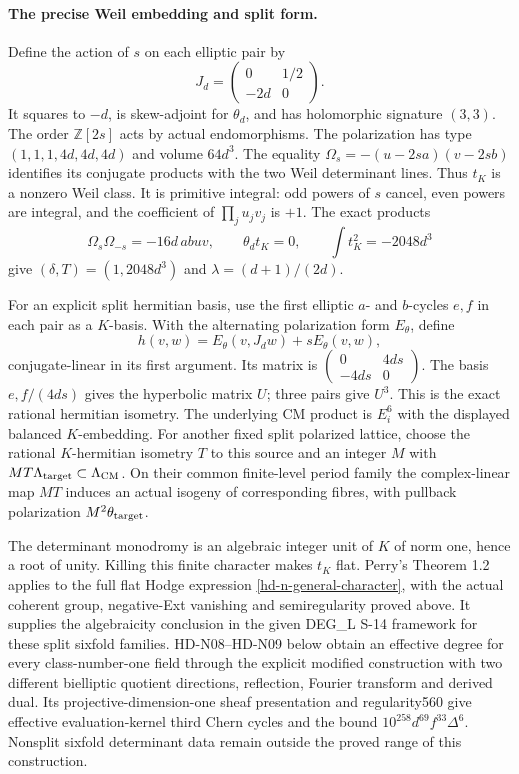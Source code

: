 \paragraph{The precise Weil embedding and split form.}
Define the action of $s$ on each elliptic pair by
\[
 J_d=\begin{pmatrix}0&1/2\\-2d&0\end{pmatrix}.
\]
It squares to $-d$, is skew-adjoint for $\theta_d$, and has
holomorphic signature $(3,3)$. The order $\mathbb Z[2s]$ acts by
actual endomorphisms. The polarization has type
$(1,1,1,4d,4d,4d)$ and volume $64d^3$. The equality
$\Omega_s=-(u-2sa)(v-2sb)$ identifies its conjugate products with the
two Weil determinant lines. Thus $t_K$ is a nonzero Weil class.
It is primitive integral: odd powers of $s$ cancel, even powers are
integral, and the coefficient of $\prod_ju_jv_j$ is $+1$.
The exact products
\[
 \Omega_s\Omega_{-s}=-16d\,abuv,
 \qquad \theta_dt_K=0,\qquad \int t_K^2=-2048d^3
\]
give $(\delta,T)=(1,2048d^3)$ and
$\lambda=(d+1)/(2d)$.

For an explicit split hermitian basis, use the first elliptic
$a$- and $b$-cycles $e,f$ in each pair as a $K$-basis. With the
alternating polarization form $E_\theta$, define
\[
 h(v,w)=E_\theta(v,J_dw)+sE_\theta(v,w),
\]
conjugate-linear in its first argument. Its matrix is
$\left(\begin{smallmatrix}0&4ds\\-4ds&0\end{smallmatrix}\right)$.
The basis $e,f/(4ds)$ gives the hyperbolic matrix $U$; three pairs give
$U^3$. This is the exact rational hermitian isometry. The underlying
CM product is $E_i^6$ with the displayed balanced $K$-embedding.
For another fixed split polarized lattice, choose the rational
$K$-hermitian isometry $T$ to this source and an integer $M$ with
$MT\Lambda_{\rm target}\subset\Lambda_{\rm CM}$. On their common
finite-level period family the complex-linear map $MT$ induces an
actual isogeny of corresponding fibres, with pullback polarization
$M^2\theta_{\rm target}$.

The determinant monodromy is an algebraic integer unit of $K$ of norm
one, hence a root of unity. Killing this finite character makes $t_K$
flat. Perry's Theorem 1.2 applies to the full flat Hodge expression
\eqref{hd-n-general-character}, with the actual coherent group,
negative-Ext vanishing and semiregularity proved above. It supplies
the algebraicity conclusion in the given DEG\_L S-14 framework for
these split sixfold families. HD-N08--HD-N09 below obtain an
effective degree for every class-number-one field through the
explicit modified construction with two different bielliptic
quotient directions, reflection, Fourier transform and derived
dual. Its projective-dimension-one sheaf presentation and
regularity560 give effective evaluation-kernel third Chern cycles
and the bound $10^{258}d^{69}f^{33}\Delta^6$.
Nonsplit sixfold determinant data remain outside the proved
range of this construction.
